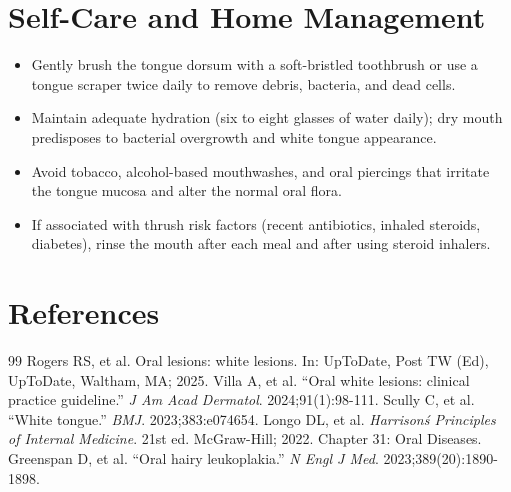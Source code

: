 \section*{Self-Care and Home Management}
\begin{itemize}
  \item Gently brush the tongue dorsum with a soft-bristled toothbrush or use a tongue scraper twice daily to remove debris, bacteria, and dead cells.
  \item Maintain adequate hydration (six to eight glasses of water daily); dry mouth predisposes to bacterial overgrowth and white tongue appearance.
  \item Avoid tobacco, alcohol-based mouthwashes, and oral piercings that irritate the tongue mucosa and alter the normal oral flora.
  \item If associated with thrush risk factors (recent antibiotics, inhaled steroids, diabetes), rinse the mouth after each meal and after using steroid inhalers.
\end{itemize}

\section*{References}
\begin{thebibliography}{99}
 Rogers RS, et al. Oral lesions: white lesions. In: UpToDate, Post TW (Ed), UpToDate, Waltham, MA; 2025.
 Villa A, et al. ``Oral white lesions: clinical practice guideline.'' \emph{J Am Acad Dermatol}. 2024;91(1):98-111.
 Scully C, et al. ``White tongue.'' \emph{BMJ}. 2023;383:e074654.
 Longo DL, et al. \emph{Harrison\'s Principles of Internal Medicine}. 21st ed. McGraw-Hill; 2022. Chapter 31: Oral Diseases.
 Greenspan D, et al. ``Oral hairy leukoplakia.'' \emph{N Engl J Med}. 2023;389(20):1890-1898.
\end{thebibliography}

